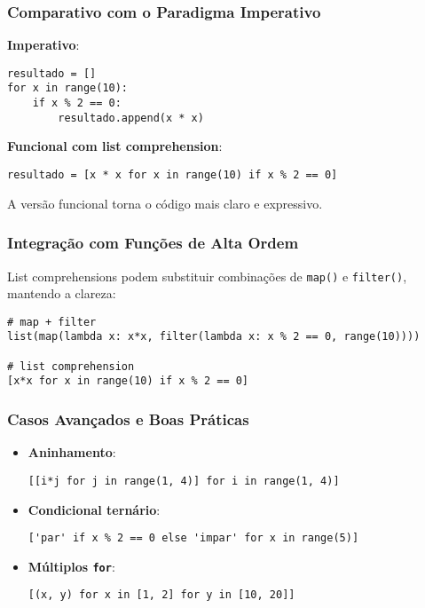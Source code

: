 \documentclass[date,twocolumn,a4paper]{ppgem}
\begin{document}
\subsubsection{Comparativo com o Paradigma Imperativo}
\textbf{Imperativo}:
\begin{verbatim}
resultado = []
for x in range(10):
    if x % 2 == 0:
        resultado.append(x * x)
\end{verbatim}

\textbf{Funcional com list comprehension}:
\begin{verbatim}
resultado = [x * x for x in range(10) if x % 2 == 0]
\end{verbatim}

A versão funcional torna o código mais claro e expressivo.

\subsubsection{Integração com Funções de Alta Ordem}
List comprehensions podem substituir combinações de \texttt{map()} e \texttt{filter()}, mantendo a clareza:

\begin{verbatim}
# map + filter
list(map(lambda x: x*x, filter(lambda x: x % 2 == 0, range(10))))

# list comprehension
[x*x for x in range(10) if x % 2 == 0]
\end{verbatim}

\subsubsection{Casos Avançados e Boas Práticas}
\begin{itemize}
  \item \textbf{Aninhamento}:
  \begin{verbatim}
[[i*j for j in range(1, 4)] for i in range(1, 4)]
  \end{verbatim}
  \item \textbf{Condicional ternário}:
  \begin{verbatim}
['par' if x % 2 == 0 else 'impar' for x in range(5)]
  \end{verbatim}
  \item \textbf{Múltiplos \texttt{for}}:
  \begin{verbatim}
[(x, y) for x in [1, 2] for y in [10, 20]]
  \end{verbatim}
\end{itemize}
\end{document}
